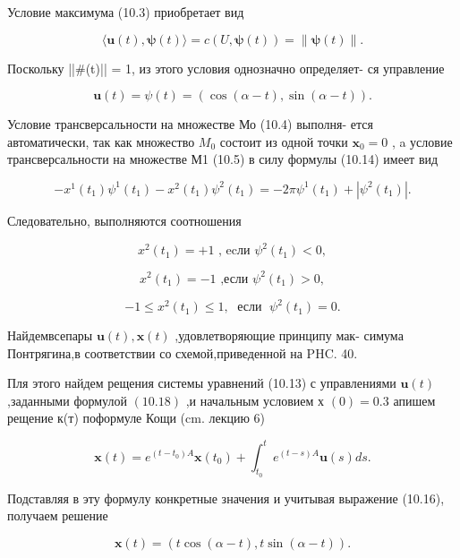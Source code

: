 \documentclass[8pt]{extarticle}
\begin{document}
Условие максимума (10.3) приобретает вид

\[
\langle \mathbf{u}\left( t\right) ,\mathbf{\psi }\left( t\right) \rangle  = c\left( {U,\mathbf{\psi }\left( t\right) }\right)  = \parallel \mathbf{\psi }\left( t\right) \parallel .
\]

Поскольку ||\#(t)|| = 1, из этого условия однозначно определяет- ся управление

\[
\mathbf{u}\left( t\right)  = \psi \left( t\right)  = \left( {\cos \left( {\alpha  - t}\right) ,\sin \left( {\alpha  - t}\right) }\right) . \tag{10.18}
\]

Условие трансверсальности на множестве Мо (10.4) выполня- ется автоматически, так как множество \({M}_{0}\) состоит из одной точки \({\mathbf{x}}_{0} = 0\) , a условие трансверсальности на множестве М1 (10.5) в силу формулы (10.14) имеет вид

\[
- {x}^{1}\left( {t}_{1}\right) {\psi }^{1}\left( {t}_{1}\right)  - {x}^{2}\left( {t}_{1}\right) {\psi }^{2}\left( {t}_{1}\right)  =  - {2\pi }{\psi }^{1}\left( {t}_{1}\right)  + \left| {{\psi }^{2}\left( {t}_{1}\right) }\right| .
\]

Следовательно, выполняются соотношения

\[
{x}^{2}\left( {t}_{1}\right)  =  + 1\text{ , ecли }{\psi }^{2}\left( {t}_{1}\right)  < 0,
\]

\[
{x}^{2}\left( {t}_{1}\right)  =  - 1\text{ ,если }{\psi }^{2}\left( {t}_{1}\right)  > 0, \tag{10.19}
\]

\[
- 1 \leq  {x}^{2}\left( {t}_{1}\right)  \leq  1,\;\text{ если }\;{\psi }^{2}\left( {t}_{1}\right)  = 0.
\]

Найдемвсепары \(\mathbf{u}\left( t\right) ,\mathbf{x}\left( t\right)\) ,удовлетворяющие принципу мак- симума Понтрягина,в соответствии со схемой,приведенной на PHC. 40.

Пля этого найдем рещения системы уравнений (10.13) с управлениями \(\mathbf{u}\left( t\right)\) ,заданными формулой \(\left( {10.18}\right)\) ,и начальным условием х \(\left( 0\right)  = {0.3}\) апишем рещение к(т) поформуле Кощи (cm. лекцию 6)

\[
\mathbf{x}\left( t\right)  = {e}^{\left( {t - {t}_{0}}\right) A}\mathbf{x}\left( {t}_{0}\right)  + {\int }_{{t}_{0}}^{t}{e}^{\left( {t - s}\right) A}\mathbf{u}\left( s\right) {ds}.
\]

Подставляя в эту формулу конкретные значения и учитывая выражение (10.16), получаем решение

\[
\mathbf{x}\left( t\right)  = \left( {t\cos \left( {\alpha  - t}\right) ,t\sin \left( {\alpha  - t}\right) }\right) . \tag{10.20}
\]
\end{document}
